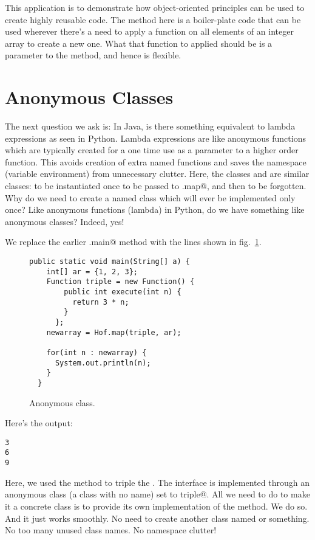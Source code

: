 \documentclass[12pt,a4paper]{article}
\begin{document}
This application is to demonstrate how object-oriented principles can be used to create highly reusable code. The \lstinline@map@ method here is a boiler-plate code that can be used wherever there's a need to apply a function on all elements of an integer array to create a new one. What that function to applied should be is a parameter to the method, and hence is flexible.

\section{Anonymous Classes}
The next question we ask is: In Java, is there something equivalent to lambda expressions as seen in Python. Lambda expressions are like anonymous functions which are typically created for a one time use as a parameter to a higher order function. This avoids creation of extra named functions and saves the namespace (variable environment) from unnecessary clutter. Here, the classes \lstinline@Dbl@ and \lstinline@Sqr@ are similar classes: to be instantiated once to be passed to \lstinline@Hof.map@, and then to be forgotten. Why do we need to create a named class which will ever be implemented only once? Like anonymous functions (lambda) in Python, do we have something like anonymous classes? Indeed, yes!

We replace the earlier \lstinline@Hof.main@ method with the lines shown in fig.~\ref{f:anon}. 
\begin{figure}[H]
\begin{lstlisting}[frame=single]
  public static void main(String[] a) {
    int[] ar = {1, 2, 3};
    Function triple = new Function() {
        public int execute(int n) {
          return 3 * n;
        }
      };
    newarray = Hof.map(triple, ar);
  
    for(int n : newarray) {
      System.out.println(n);
    }
  }
\end{lstlisting}
\caption{Anonymous class.}
\label{f:anon}
\end{figure}

Here's the output:
\begin{lstlisting}[frame=single]
3
6
9
\end{lstlisting}

Here, we used the \lstinline@map@ method to triple the \lstinline@array@. The \lstinline@Function@ interface is implemented through an anonymous class (a class with no name) set to \lstinline@Function triple@. All we need to do to make it a concrete class is to provide its own implementation of the \lstinline@execute@ method. We do so. And it just works smoothly. No need to create another class named \lstinline@Triple@ or something. No too many unused class names. No namespace clutter!
\end{document}
